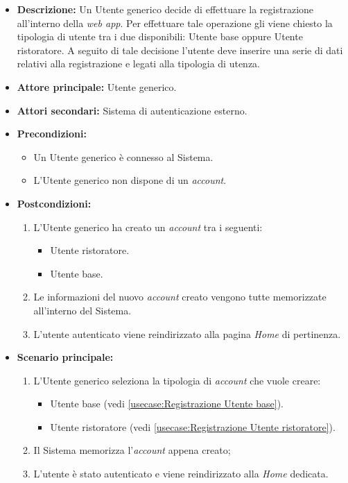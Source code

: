 \label{usecase:Effettua registrazione}

\begin{itemize}
	\item \textbf{Descrizione:} Un Utente generico decide di effettuare la registrazione all'interno della \textit{web app}. Per effettuare tale
	operazione gli viene chiesto la tipologia di utente tra i due disponibili: Utente base oppure Utente ristoratore. 
    A seguito di tale decisione l'utente deve inserire una serie di dati relativi alla registrazione e legati alla tipologia di utenza.

	\item \textbf{Attore principale:} Utente generico.
	\item \textbf{Attori secondari:} Sistema di autenticazione esterno.
	\item \textbf{Precondizioni:}
        \begin{itemize}
            \item Un Utente generico è connesso al Sistema.
            \item L'Utente generico non dispone di un \textit{account}.
        \end{itemize}
	\item \textbf{Postcondizioni:}
	    \begin{enumerate}
            \item L'Utente generico ha creato un \textit{account} tra i seguenti:
            \begin{itemize}
                \item Utente ristoratore.
                \item Utente base.
            \end{itemize}
            \item Le informazioni del nuovo \textit{account} creato vengono tutte memorizzate all'interno del Sistema.
            \item L'utente autenticato viene reindirizzato alla pagina \textit{Home} di pertinenza.
        \end{enumerate}


	\item \textbf{Scenario principale:}
	      \begin{enumerate}
		      \item L'Utente generico seleziona la tipologia di \textit{account} che vuole creare: 
		      \begin{itemize}
				\item Utente base (vedi \autoref{usecase:Registrazione Utente base}).
				\item Utente ristoratore (vedi \autoref{usecase:Registrazione Utente ristoratore}).
			  \end{itemize} 
              \item Il Sistema memorizza l'\textit{account} appena creato;
		      \item L'utente è stato autenticato e viene reindirizzato alla \textit{Home} dedicata.
	      \end{enumerate}
		

\end{itemize}
